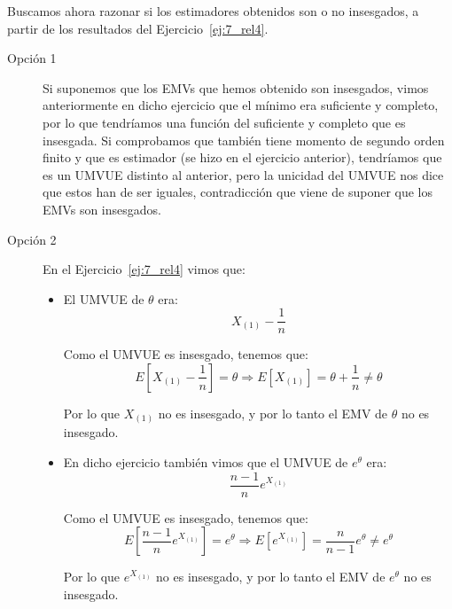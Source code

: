 \begin{ejercicio}
    \noindent
    Buscamos ahora razonar si los estimadores obtenidos son o no insesgados, a partir de los resultados del Ejercicio~\ref{ej:7_rel4}.
    \begin{description}
        \item[Opción 1] Si suponemos que los EMVs que hemos obtenido son insesgados, vimos anteriormente en dicho ejercicio que el mínimo era suficiente y completo, por lo que tendríamos una función del suficiente y completo que es insesgada. Si comprobamos que también tiene momento de segundo orden finito y que es estimador (se hizo en el ejercicio anterior), tendríamos que es un UMVUE distinto al anterior, pero la unicidad del UMVUE nos dice que estos han de ser iguales, contradicción que viene de suponer que los EMVs son insesgados.
        \item[Opción 2] En el Ejercicio~\ref{ej:7_rel4} vimos que:
        \begin{itemize}
            \item El UMVUE de $\theta$ era:
            \begin{equation*}
                X_{(1)} - \frac{1}{n}
            \end{equation*}

            Como el UMVUE es insesgado, tenemos que:
            \begin{equation*}
                E\left[X_{(1)} - \frac{1}{n}\right] = \theta \Longrightarrow E[X_{(1)}] = \theta + \frac{1}{n} \neq \theta
            \end{equation*}

            Por lo que $X_{(1)}$ no es insesgado, y por lo tanto el EMV de $\theta$ no es insesgado.

            \item En dicho ejercicio también vimos que el UMVUE de $e^\theta$ era:
            \begin{equation*}
                \dfrac{n-1}{n}e^{X_{(1)}}
            \end{equation*}

            Como el UMVUE es insesgado, tenemos que:
            \begin{equation*}
                E\left[\dfrac{n-1}{n}e^{X_{(1)}}\right] = e^\theta \Longrightarrow E[e^{X_{(1)}}] = \frac{n}{n-1}e^\theta \neq e^\theta
            \end{equation*}

            Por lo que $e^{X_{(1)}}$ no es insesgado, y por lo tanto el EMV de $e^\theta$ no es insesgado.
        \end{itemize}
    \end{description}
\end{ejercicio}

